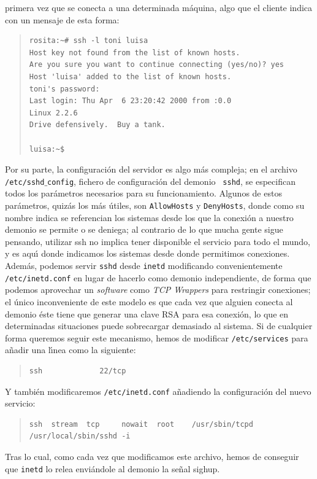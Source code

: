 primera vez que se conecta a una determinada m\'aquina, algo que el cliente 
indica con un mensaje de esta forma:
\begin{quote}
\begin{verbatim}
rosita:~# ssh -l toni luisa
Host key not found from the list of known hosts.
Are you sure you want to continue connecting (yes/no)? yes
Host 'luisa' added to the list of known hosts.
toni's password: 
Last login: Thu Apr  6 23:20:42 2000 from :0.0
Linux 2.2.6
Drive defensively.  Buy a tank.

luisa:~$
\end{verbatim}
\end{quote}
Por su parte, la configuraci\'on del servidor es algo m\'as compleja; en el 
archivo {\tt /etc/sshd$\_$config}, fichero de configuraci\'on del demonio {\tt
sshd}, se especifican todos los par\'ametros necesarios para su funcionamiento.
Algunos de estos par\'ametros, quiz\'as los m\'as \'utiles, son {\tt AllowHosts}
y {\tt DenyHosts}, donde como su nombre indica se referencian los sistemas desde
los que la conexi\'on a nuestro demonio se permite o se deniega; al contrario
de lo que mucha gente sigue pensando, utilizar {\sc ssh} no implica tener 
disponible el servicio para todo el mundo, y es aqu\'{\i} donde indicamos los
sistemas desde donde permitimos conexiones. Adem\'as, podemos servir {\tt sshd} 
desde {\tt inetd} modificando convenientemente {\tt /etc/inetd.conf} en lugar
de hacerlo como demonio independiente, de forma que podemos aprovechar un
{\it software} como {\it TCP Wrappers} para restringir conexiones; el \'unico 
inconveniente de este modelo es que cada vez que alguien conecta al demonio 
\'este tiene que generar una clave RSA para esa conexi\'on, lo que en 
determinadas situaciones puede sobrecargar demasiado al sistema. Si de cualquier
forma queremos seguir este mecanismo, hemos de modificar {\tt /etc/services} 
para a\~nadir una l\'{\i}nea como la siguiente:
\begin{quote}
\begin{verbatim}
ssh             22/tcp
\end{verbatim}
\end{quote}
Y tambi\'en modificaremos {\tt /etc/inetd.conf} a\~nadiendo la configuraci\'on
del nuevo servicio:
\begin{quote}
\begin{verbatim}
ssh  stream  tcp     nowait  root    /usr/sbin/tcpd /usr/local/sbin/sshd -i
\end{verbatim}
\end{quote}
Tras lo cual, como cada vez que modificamos este archivo, hemos de conseguir que
{\tt inetd} lo relea envi\'andole al demonio la se\~nal {\sc sighup}.
